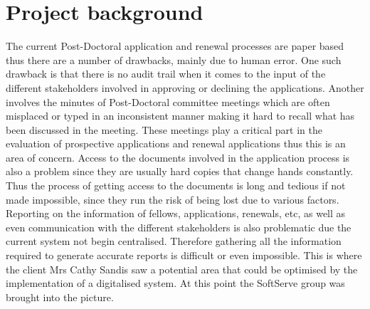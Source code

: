 \documentclass[12pt]{article}
\begin{document}
\section{Project background}
\vspace{0.2in}
The current Post-Doctoral application and renewal processes are paper based thus there are a number of drawbacks, mainly due to human error. One such drawback is that there is no audit trail when it comes to the input of the different stakeholders involved in approving or declining the applications. Another involves the minutes of Post-Doctoral committee meetings which are often misplaced or typed in an inconsistent manner making it hard to recall what has been discussed in the meeting. These meetings play a critical part in the evaluation of prospective applications and renewal applications thus this is an area of concern. Access to the documents involved in the application process is also a problem since they are usually hard copies that change hands constantly. Thus the process of getting access to the documents is long and tedious if not made impossible, since they run the risk of being lost due to various factors. Reporting on the information of fellows, applications, renewals, etc, as well as even communication with the different stakeholders is also problematic due the current system not begin centralised. Therefore gathering all the information required to generate accurate reports is difficult or even impossible. This is where the client Mrs Cathy Sandis saw a potential area that could be optimised by the implementation of a digitalised system. At this point the SoftServe group was brought into the picture.
\vspace{0.5in}

\newpage
\end{document}
